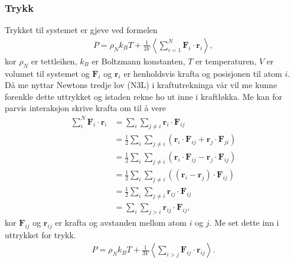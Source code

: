 \documentclass[12pt, a4paper]{article}
\theoremstyle{definition} \newtheorem*{definition}{Teorem}
\newcommand{\vb}{\mathbf}
\begin{document}
        \subsubsection*{Trykk}
            Trykket til systemet er gjeve ved formelen 
            \begin{align*}
                P = \rho_Nk_BT + \frac{1}{3V}\left \langle \sum_{i = 1}^N \vb{F}_{i}\cdot\vb{r}_{i} \right \rangle,
            \end{align*}
            kor $\rho_N$ er tettleiken, $k_B$ er Boltzmann konstanten, $T$ er temperaturen, $V$ er volumet til systemet og $\vb{F}_i$ og $\vb{r}_i$ er henholdsvis krafta
            og posisjonen til atom $i$. Då me nyttar Newtons tredje lov (N3L) i kraftutrekninga vår vil me kunne forenkle dette uttrykket og istaden rekne ho ut inne i kraftløkka.
            Me kan for parvis interaksjon skrive krafta om til å vere
            \begin{align*}
                \sum_i^N \vb{F}_i\cdot\vb{r}_i &= \sum_i\sum_{j\neq i}\vb{r}_i\cdot \vb{F}_{ij} \\
                &= \frac{1}{2}\sum_i\sum_{j\neq i }\left( \vb{r}_i\cdot\vb{F}_{ij} + \vb{r}_j\cdot\vb{F}_{ji} \right) \\
                &= \frac{1}{2}\sum_i\sum_{j\neq i}(\vb{r}_i\cdot\vb{F}_{ij} - \vb{r}_j\cdot\vb{F}_{ij}) \\
                &= \frac{1}{2}\sum_i\sum_{j\neq i}( (\vb{r}_i - \vb{r}_j)\cdot\vb{F}_{ij}) \\
                &= \frac{1}{2}\sum_i\sum_{j\neq i} \vb{r}_{ij}\cdot\vb{F}_{ij} \\
                &= \sum_i\sum_{j > i}\vb{r}_{ij}\cdot\vb{F}_{ij},
            \end{align*}
            kor $\vb{F}_{ij}$ og $\vb{r}_{ij}$ er krafta og avstanden mellom atom $i$ og $j$. Me set dette inn i uttrykket for trykk.
            \begin{align*}
                P = \rho_Nk_BT + \frac{1}{3V}\left \langle \sum_{i > j} \vb{F}_{ij}\cdot\vb{r}_{ij} \right \rangle.
            \end{align*}
\end{document}
